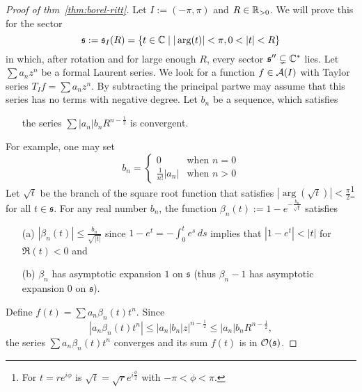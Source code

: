 \begin{proof}[Proof of thm~\ref{thm:borel-ritt}]
  Let $I:=(-\pi,\pi)$ and $R\in\mathbb{R}_{>0}$.
  We will prove this for the sector
  \[
    \mathfrak{s}:=\mathfrak{s}_{I}(R)=\left\{
      t\in\C\mid |\arg(t)|<\pi, 0<|t|<R
    \right\}
  \]
  in which, after rotation and for large enough $R$, every sector
  $\mathfrak{s}''\subsetneq\mathbb{C}^*$ lies.
  Let $\sum a_nz^n$ be a formal Laurent series. We look for a function
  $f\in\mathcal{A}(I)$ with Taylor series $T_{I}f=\sum a_nz^n$.
  By subtracting the principal part\TODO[?] we may assume that this series has
  no terms with negative degree.
  Let $b_n$ be a sequence, which satisfies
  \begin{itemize}
    \item[] the series $\sum |a_n|b_nR^{n-\frac{1}{2}}$ is convergent.
  \end{itemize}
  For example\TODO[realy?], one may set
  \[
    b_n=\begin{cases}
      0                 & \text{when~} n=0
      \\\frac{1}{n!}|a_n| & \text{when~} n>0
    \end{cases}
  \]
  Let $\sqrt{t}$ be the branch of the square root function that satisfies
  $|\arg(\sqrt{t})|<\frac{\pi}{2}$\footnote{For $t=re^{i\phi}$ is
  $\sqrt{t}=\sqrt{r}e^{i\frac{\phi}{2}}$ with $-\pi<\phi<\pi$.} for all
  $t\in\mathfrak{s}$.
  For any real number $b_n$, the function
  $\beta_n(t):=1-e^{-\frac{b_n}{\sqrt{t}}}$ satisfies
  \begin{enumerate}
    \item[(a)] $|\beta_n(t)|\leq\frac{b_n}{\sqrt{|t|}}$ since
      $1-e^t=-\int_0^te^s\,ds$ implies that $|1-e^t|<|t|$ for $\Re(t)<0$ and
    \item[(b)] $\beta_n$ has asymptotic expansion $1$ on $\mathfrak{s}$ (thus
      $\beta_n-1$ has asymptotic expansion $0$ on $\mathfrak{s}$).
  \end{enumerate}
  Define $f(t)=\sum a_n\beta_n(t)t^n$.
  Since 
  \[
    |a_n\beta_n(t)t^n|
    \leq|a_n|b_n|z|^{n-\frac{1}{2}}
    \leq|a_n|b_nR^{n-\frac{1}{2}},
  \]
  the series
  $\sum a_n\beta_n(t)t^n$ converges and its sum $f(t)$ is in
  $\mathcal{O}(\mathfrak{s})$.


\end{proof}
